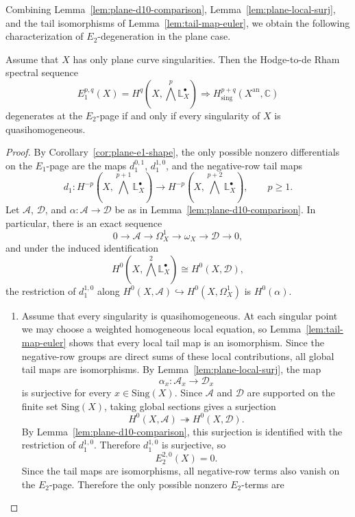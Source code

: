 \documentclass[12pt,reqno]{amsart}
\begin{document}
Combining Lemma~\ref{lem:plane-d10-comparison}, Lemma~\ref{lem:plane-local-surj}, and the tail isomorphisms of Lemma~\ref{lem:tail-map-euler}, we obtain the following characterization of \(E_2\)-degeneration in the plane case.

\begin{proposition}\label{prop:plane-case}
Assume that \(X\) has only plane curve singularities. Then the Hodge-to-de Rham spectral sequence
\[
E_1^{p,q}(X)=H^q\!\left(X,\bigwedge^p\mathbb{L}^{\bullet}_X\right)
\Longrightarrow H^{p+q}_{\mathrm{sing}}(X^{\mathrm{an}},\mathbb C)
\]
degenerates at the \(E_2\)-page if and only if every singularity of $X$ is quasihomogeneous.
\end{proposition}

\begin{proof}
By Corollary~\ref{cor:plane-e1-shape}, the only possible nonzero differentials on the \(E_1\)-page are the maps \(d_1^{0,1}\), \(d_1^{1,0}\), and the negative-row tail maps
\[
d_1:H^{-p}\!\left(X,\bigwedge^{p+1}\mathbb{L}^{\bullet}_X\right)
\longrightarrow
H^{-p}\!\left(X,\bigwedge^{p+2}\mathbb{L}^{\bullet}_X\right),
\qquad p\ge 1.
\]
Let \(\mathcal A\), \(\mathcal D\), and \(\alpha:\mathcal A\to \mathcal D\) be as in Lemma~\ref{lem:plane-d10-comparison}. In particular, there is an exact sequence
\[
0\to \mathcal A\to \Omega_X^1\to \omega_X\to \mathcal D\to 0,
\]
and under the induced identification
\[
H^0\!\left(X,\bigwedge^2\mathbb{L}^{\bullet}_X\right)\cong H^0(X,\mathcal D),
\]
the restriction of \(d_1^{1,0}\) along \(H^0(X,\mathcal A)\hookrightarrow H^0(X,\Omega_X^1)\) is \(H^0(\alpha)\).
\begin{enumerate}
\item
Assume that every singularity is quasihomogeneous. At each singular point we may choose a weighted homogeneous local equation, so Lemma~\ref{lem:tail-map-euler} shows that every local tail map is an isomorphism. Since the negative-row groups are direct sums of these local contributions, all global tail maps are isomorphisms.
By Lemma~\ref{lem:plane-local-surj}, the map
\[
\alpha_x:\mathcal A_x\longrightarrow \mathcal D_x
\]
is surjective for every \(x\in \mathrm{Sing}(X)\). Since \(\mathcal A\) and \(\mathcal D\) are supported on the finite set \(\mathrm{Sing}(X)\), taking global sections gives a surjection
\[
H^0(X,\mathcal A)\twoheadrightarrow H^0(X,\mathcal D).
\]
By Lemma~\ref{lem:plane-d10-comparison}, this surjection is identified with the restriction of \(d_1^{1,0}\). Therefore \(d_1^{1,0}\) is surjective, so
\[
E_2^{2,0}(X)=0.
\]
Since the tail maps are isomorphisms, all negative-row terms also vanish on the \(E_2\)-page. Therefore the only possible nonzero \(E_2\)-terms are

\end{enumerate}
\end{proof}
\end{document}
